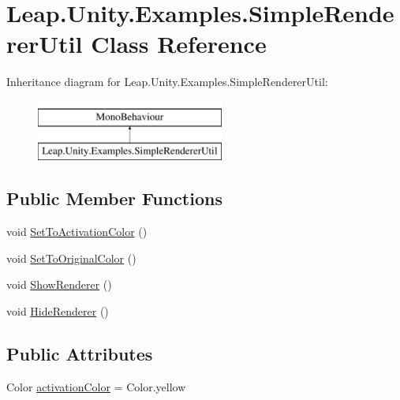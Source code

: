 \hypertarget{class_leap_1_1_unity_1_1_examples_1_1_simple_renderer_util}{}\section{Leap.\+Unity.\+Examples.\+Simple\+Renderer\+Util Class Reference}
\label{class_leap_1_1_unity_1_1_examples_1_1_simple_renderer_util}
Inheritance diagram for Leap.\+Unity.\+Examples.\+Simple\+Renderer\+Util\+:\begin{figure}[H]
\begin{center}
\leavevmode
\includegraphics[height=2.000000cm]{class_leap_1_1_unity_1_1_examples_1_1_simple_renderer_util}
\end{center}
\end{figure}
\subsection*{Public Member Functions}
\begin{DoxyCompactItemize}
\item 
void \mbox{\hyperlink{class_leap_1_1_unity_1_1_examples_1_1_simple_renderer_util_ac7e495a39a255450afa2154fa2d6bbca}{Set\+To\+Activation\+Color}} ()
\item 
void \mbox{\hyperlink{class_leap_1_1_unity_1_1_examples_1_1_simple_renderer_util_a54d5fe66bf9817c28138259d20cf0654}{Set\+To\+Original\+Color}} ()
\item 
void \mbox{\hyperlink{class_leap_1_1_unity_1_1_examples_1_1_simple_renderer_util_ab9e20b721aaebd06920d5d9d62866766}{Show\+Renderer}} ()
\item 
void \mbox{\hyperlink{class_leap_1_1_unity_1_1_examples_1_1_simple_renderer_util_a970053d6131f2abcff7011aeef0ffcde}{Hide\+Renderer}} ()
\end{DoxyCompactItemize}
\subsection*{Public Attributes}
\begin{DoxyCompactItemize}
\item 
Color \mbox{\hyperlink{class_leap_1_1_unity_1_1_examples_1_1_simple_renderer_util_a955bfd7d7f62ceddbe8e8840db4e1dd6}{activation\+Color}} = Color.\+yellow
\end{DoxyCompactItemize}


